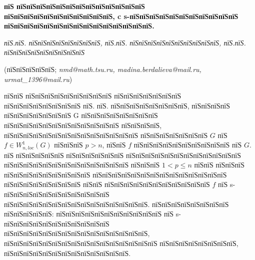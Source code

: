 \documentclass[a5paper, 12pt, openbib]{report}
\begin{document}
\begin{center}
    {\bf пїЅ пїЅпїЅпїЅпїЅпїЅпїЅпїЅпїЅпїЅпїЅпїЅпїЅпїЅ пїЅпїЅпїЅпїЅпїЅпїЅпїЅпїЅпїЅпїЅпїЅ, c s-пїЅпїЅпїЅпїЅпїЅпїЅпїЅпїЅпїЅпїЅпїЅ пїЅпїЅпїЅпїЅпїЅпїЅпїЅпїЅпїЅпїЅпїЅпїЅпїЅпїЅпїЅ.}

    {\it пїЅ.пїЅ. пїЅпїЅпїЅпїЅпїЅпїЅпїЅпїЅ, пїЅ.пїЅ. пїЅпїЅпїЅпїЅпїЅпїЅпїЅпїЅпїЅпїЅ, пїЅ.пїЅ. пїЅпїЅпїЅпїЅпїЅпїЅпїЅпїЅпїЅ}

    (пїЅпїЅпїЅпїЅпїЅ; {\it nmd@math.tsu.ru, madina.berdalieva@mail.ru, urmat\_1396@mail.ru})
\end{center}

пїЅпїЅ пїЅпїЅпїЅпїЅпїЅпїЅпїЅпїЅпїЅ пїЅпїЅпїЅпїЅпїЅпїЅпїЅ пїЅпїЅпїЅпїЅпїЅпїЅпїЅпїЅ пїЅ. пїЅ. пїЅпїЅпїЅпїЅпїЅпїЅпїЅпїЅ, пїЅпїЅпїЅпїЅ пїЅпїЅпїЅпїЅпїЅпїЅпїЅ  G пїЅпїЅпїЅпїЅпїЅпїЅпїЅпїЅ пїЅпїЅпїЅпїЅпїЅпїЅпїЅпїЅпїЅпїЅпїЅпїЅ пїЅпїЅпїЅпїЅ,  пїЅпїЅпїЅпїЅпїЅпїЅпїЅпїЅпїЅпїЅпїЅпїЅпїЅпїЅ пїЅпїЅпїЅпїЅпїЅпїЅпїЅ $G$ пїЅ $f \in W^{1}_{n,loc}(G)$ пїЅпїЅпїЅ $p>n$, пїЅпїЅ $f$ пїЅпїЅпїЅпїЅпїЅпїЅпїЅпїЅпїЅпїЅ пїЅ $G$. пїЅ пїЅпїЅпїЅпїЅпїЅ пїЅпїЅпїЅпїЅпїЅпїЅ пїЅпїЅпїЅпїЅпїЅпїЅпїЅпїЅпїЅпїЅпїЅпїЅ пїЅпїЅпїЅпїЅпїЅпїЅпїЅпїЅпїЅпїЅпїЅпїЅпїЅ  пїЅпїЅпїЅ $1<p\leq n$ пїЅпїЅ пїЅпїЅпїЅ пїЅпїЅпїЅпїЅпїЅпїЅпїЅпїЅпїЅ пїЅпїЅпїЅпїЅпїЅпїЅпїЅпїЅпїЅпїЅпїЅпїЅпїЅпїЅ пїЅпїЅпїЅпїЅпїЅпїЅпїЅпїЅ пїЅпїЅ пїЅпїЅпїЅпїЅпїЅпїЅпїЅпїЅпїЅпїЅпїЅ  $f$ пїЅ s-пїЅпїЅпїЅпїЅпїЅпїЅпїЅпїЅпїЅпїЅпїЅ пїЅпїЅпїЅпїЅпїЅпїЅпїЅпїЅпїЅпїЅпїЅпїЅпїЅпїЅпїЅ. 
пїЅпїЅпїЅпїЅпїЅпїЅпїЅпїЅ пїЅпїЅпїЅпїЅпїЅ: пїЅпїЅпїЅпїЅпїЅпїЅпїЅпїЅпїЅпїЅпїЅ пїЅ s-пїЅпїЅпїЅпїЅпїЅпїЅпїЅпїЅпїЅпїЅпїЅ пїЅпїЅпїЅпїЅпїЅпїЅпїЅпїЅпїЅпїЅпїЅпїЅпїЅпїЅпїЅ, пїЅпїЅпїЅпїЅпїЅпїЅпїЅпїЅпїЅпїЅпїЅпїЅпїЅпїЅпїЅпїЅ пїЅпїЅпїЅпїЅпїЅпїЅпїЅпїЅ, пїЅпїЅпїЅпїЅпїЅпїЅпїЅпїЅпїЅпїЅпїЅпїЅпїЅ.
\end{document}
